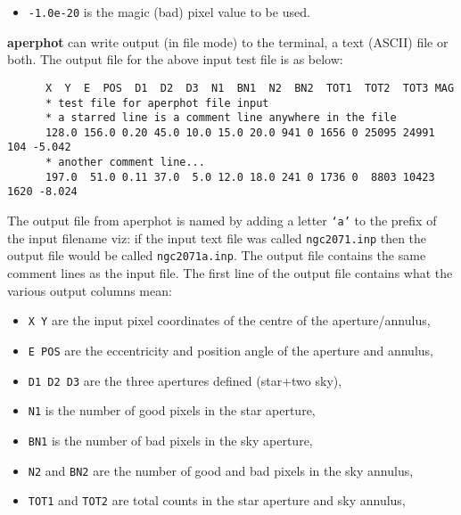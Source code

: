 \begin{description}
\begin{itemize}
\item {\tt -1.0e-20} is the magic (bad) pixel value to be used.

\end{itemize}

{\bf aperphot} can write output (in file mode) to the terminal, a text
(ASCII) file or both.  The output file for the above input test file is
as below:

\begin{small}
\begin{verbatim}
      X  Y  E  POS  D1  D2  D3  N1  BN1  N2  BN2  TOT1  TOT2  TOT3 MAG
      * test file for aperphot file input
      * a starred line is a comment line anywhere in the file
      128.0 156.0 0.20 45.0 10.0 15.0 20.0 941 0 1656 0 25095 24991  104 -5.042
      * another comment line...
      197.0  51.0 0.11 37.0  5.0 12.0 18.0 241 0 1736 0  8803 10423 1620 -8.024
\end{verbatim}
\end{small}

The output file from aperphot is named by adding a letter {\tt `a'} to the
prefix of the input filename viz: if the input text file was called
{\tt ngc2071.inp} then the output file would be called {\tt ngc2071a.inp}.
The output file contains the same comment lines as the input file.  The
first line of the output file contains what the various output columns mean:

\begin{itemize}

\item {\tt X Y} are the input pixel coordinates of the centre of the
aperture/annulus,

\item {\tt E POS} are the eccentricity and position angle of the
aperture and annulus,

\item {\tt D1 D2 D3} are the three apertures defined (star+two sky),

\item {\tt N1} is the number of good pixels in the star aperture,

\item {\tt BN1} is the number of bad pixels in the sky aperture,

\item {\tt N2} and {\tt BN2} are the number of good and bad pixels in
the sky annulus,

\item {\tt TOT1} and {\tt TOT2} are total counts in
the star aperture and sky annulus,


\end{itemize}
\end{description}
